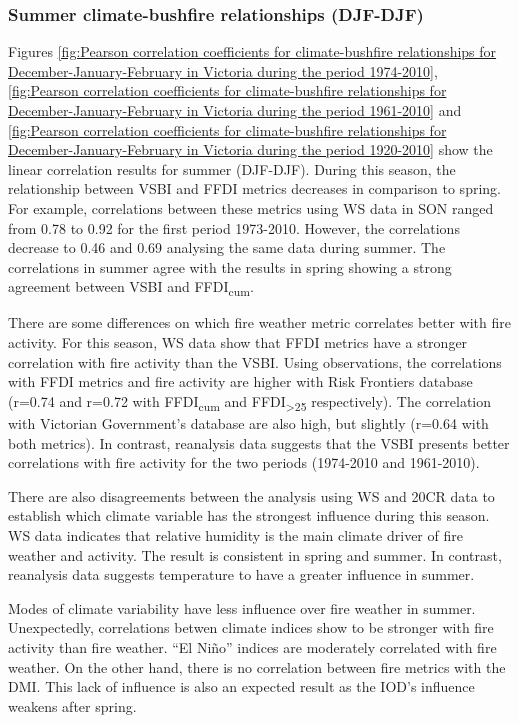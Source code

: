 \subsubsection{Summer climate-bushfire relationships (DJF-DJF)}

Figures \ref{fig:Pearson correlation coefficients for climate-bushfire relationships for December-January-February in Victoria during the period 1974-2010},
\ref{fig:Pearson correlation coefficients for climate-bushfire relationships for December-January-February in Victoria during the period 1961-2010}
and \ref{fig:Pearson correlation coefficients for climate-bushfire relationships for December-January-February in Victoria during the period 1920-2010}
show the linear correlation results for summer (DJF-DJF). During this
season, the relationship between VSBI and FFDI metrics decreases in
comparison to spring. For example, correlations between these metrics
using WS data in SON ranged from 0.78 to 0.92 for the first period
1973-2010. However, the correlations decrease to 0.46 and 0.69 analysing
the same data during summer. The correlations in summer agree with
the results in spring showing a strong agreement between VSBI and
FFDI\textsubscript{cum}.

There are some differences on which fire weather metric correlates
better with fire activity. For this season, WS data show that FFDI
metrics have a stronger correlation with fire activity than the VSBI.
Using observations, the correlations with FFDI metrics and fire activity
are higher with Risk Frontiers database (r=0.74 and r=0.72 with FFDI\textsubscript{cum}
and FFDI\textsubscript{>25} respectively). The correlation
with Victorian Government's database are also high, but slightly (r=0.64 with both
metrics). In contrast, reanalysis data suggests that the VSBI presents
better correlations with fire activity for the two periods (1974-2010
and 1961-2010).

There are also disagreements between the analysis using WS and 20CR
data to establish which climate variable has the strongest influence
during this season. WS data indicates that relative humidity is the
main climate driver of fire weather and activity. The result is consistent
in spring and summer. In contrast, reanalysis data suggests temperature
to have a greater influence in summer.

Modes of climate variability have less influence over fire weather
in summer. Unexpectedly, correlations betwen climate indices show
to be stronger with fire activity than fire weather. \textquotedblleft El
Ni\~no\textquotedblright{} indices are moderately correlated with fire
weather. On the other hand, there is no correlation between fire metrics
with the DMI. This lack of influence is also an expected result as
the IOD's influence weakens after spring. 

